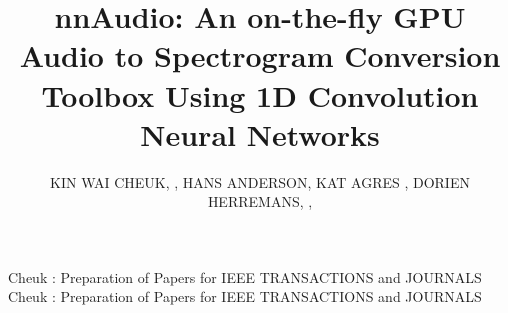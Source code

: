 \documentclass{ieeeaccess}
\begin{document}

\title{nnAudio: An on-the-fly GPU Audio to Spectrogram Conversion Toolbox Using 1D Convolution Neural Networks}
\author{\uppercase{Kin Wai Cheuk}, ,
\uppercase{Hans Anderson, Kat Agres , Dorien Herremans}, ,}
\address[1]{Information Systems, Technology and Design, Singapore University of Technology and Design, 8 Somapah Rd, Singapore 487372 (e-mail: kinwai\_cheuk@mymail.sutd.edu.sg, dorien\_herremans@sutd.edu.sg)}
\address[2]{Institute of High Performance Computing, Agency for Science, Technology and Research, 1 Fusionopolis Way, \#16-16 Connexis, Singapore 138632 (e-mail: kat\_agres@ihpc.a-star.edu.sg)}
\address[3]{Blue Mangoo Software (email: hans@bluemangoo.com)}
\address[4]{Yong Siew Toh Conservatory of Music, National University of Singapore, 3 Conservatory Drive, Singapore 117376 (e-mail: muskra@nus.edu.sg)}

\markboth
{Cheuk \headeretal: Preparation of Papers for IEEE TRANSACTIONS and JOURNALS}
{Cheuk \headeretal: Preparation of Papers for IEEE TRANSACTIONS and JOURNALS}

\end{document}
